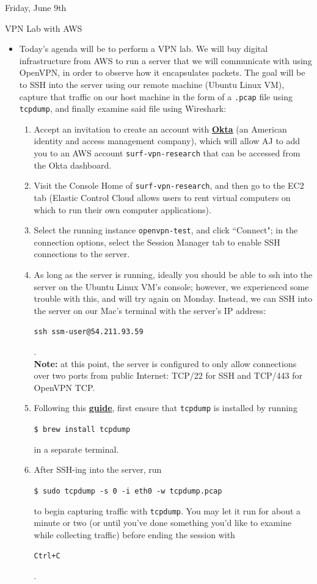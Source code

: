 \documentclass[11pt]{article}
\newcommand\codebox[1]{
    \noindent\hspace{-0.25em}\begin{tcolorbox}[on line, hbox, colback = codeblack, colframe = codeborder, coltext = white, boxrule = 1.5pt, left = 2pt, right = 2pt, top = 0.5pt, bottom = 0.5pt]
    \small\texttt{#1}\normalsize
    \end{tcolorbox}\hspace{-0.25em}
}
\begin{document}
\normalsize\begin{orangebox}{Friday, June 9th\vspace{-2em}\begin{flushright}VPN Lab with AWS \end{flushright}}
\begin{itemize}
    \item Today's agenda will be to perform a VPN lab. We will buy digital infrastructure from AWS to run a server that we will communicate with using OpenVPN, in order to observe how it encapsulates packets. The goal will be to SSH into the server using our remote machine (Ubuntu Linux VM), capture that traffic on our host machine in the form of a \texttt{.pcap} file using \texttt{tcpdump}, and finally examine said file using Wireshark:
    \begin{enumerate}
        \item Accept an invitation to create an account with \href{https://en.wikipedia.org/wiki/Okta,_Inc.}{\textbf{Okta}} (an American identity and access management company), which will allow AJ to add you to an AWS account \texttt{surf-vpn-research} that can be accessed from the Okta dashboard.
        \item Visit the Console Home of \texttt{surf-vpn-research}, and then go to the EC2 tab (Elastic Control Cloud allows users to rent virtual computers on which to run their own computer applications).
        \item Select the running instance \texttt{openvpn-test}, and click ``Connect"; in the connection options, select the Session Manager tab to enable SSH connections to the server.
        \item As long as the server is running, ideally you should be able to ssh into the server on the Ubuntu Linux VM's console; however, we experienced some trouble with this, and will try again on Monday. Instead, we can SSH into the server on our Mac's terminal with the server's IP address: \codebox{ssh ssm-user@54.211.93.59}. \\
        \textbf{Note:} at this point, the server is configured to only allow connections over two ports from public Internet: TCP/22 for SSH and TCP/443 for OpenVPN TCP.
        \item Following this \href{https://www.comparitech.com/net-admin/tcpdump-capture-wireshark/}{\textbf{guide}}, first ensure that \texttt{tcpdump} is installed by running \codebox{\$ brew install tcpdump} in a separate terminal.
        \item After SSH-ing into the server, run \codebox{\$ sudo tcpdump -s 0 -i eth0 -w tcpdump.pcap} to begin capturing traffic with \texttt{tcpdump}. You may let it run for about a minute or two (or until you've done something you'd like to examine while collecting traffic) before ending the session with \codebox{Ctrl+C}.

\end{enumerate}
\end{itemize}
\end{orangebox}
\end{document}
